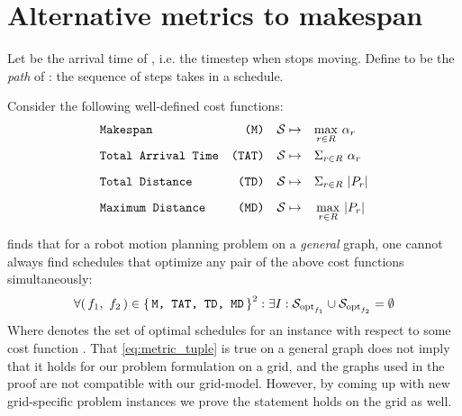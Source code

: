 \section{Alternative metrics to makespan}\label{chapter:alternative_metrics}


Let  be the arrival time of , i.e. the timestep when  stops moving. Define  to be the \emph{path} of : the sequence of steps  takes in a schedule. 

Consider the following well-defined cost functions:
\begin{align*}
	& \texttt{Makespan} 				& \texttt{(M)} && \mathcal{S} \mapsto \quad & \smash{\max_{r \in R}} \ \alpha_r 	\\[2mm] 
	& \texttt{Total Arrival Time} 	& \texttt{(TAT)} && \mathcal{S} \mapsto \quad & \Sigma_{r \in R} \ \alpha_r 		\\[2mm]
	& \texttt{Total Distance} 		& \texttt{(TD)} && \mathcal{S} \mapsto \quad & \Sigma_{r \in R} \ \lvert P_r\rvert 		\\[2mm]
	& \texttt{Maximum Distance} 		& \texttt{(MD)} && \mathcal{S} \mapsto \quad & \max_{r \in R} \ \lvert P_r\rvert
\end{align*}


\cite{corr/YuL15c} finds that for a robot motion planning problem on a \emph{general} graph, one cannot always find schedules that optimize any pair of the above cost functions simultaneously: 
\begin{align}\label{eq:metric_tuple}
	\forall (\, f_1,\ f_2 \,) \in \set{\texttt{M, TAT, TD, MD}}^2 : \exists I : \mathcal{S}_{\text{opt}_{f_1}} \cup \mathcal{S}_{\text{opt}_{f_2}} = \emptyset
\end{align}
Where  denotes the set of optimal schedules for an instance  with respect to some cost function . That \cref{eq:metric_tuple} is true on a general graph does not imply that it holds for our problem formulation on a grid, and the graphs used in the proof are not compatible with our grid-model. However, by coming up with new grid-specific problem instances we prove the statement holds on the grid as well.

